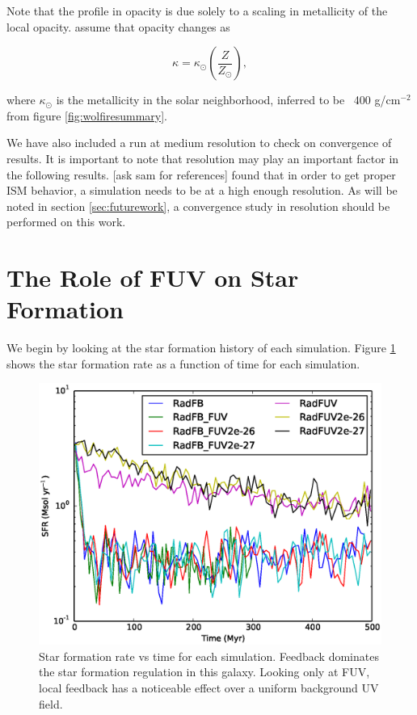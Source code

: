 Note that the profile in opacity is due solely to a scaling in metallicity of the local opacity. \citet{wolfireEt03} assume that opacity changes as

\begin{equation}
\kappa = \kappa_{\odot}\left(\frac{Z}{Z_{\odot}}\right),
\end{equation}

where $\kappa_{\odot}$ is the metallicity in the solar neighborhood, inferred to be ~400 g/cm$^{-2}$ from figure \ref{fig:wolfiresummary}.

We have also included a run at medium resolution to check on convergence of results. It is important to note that resolution may play an important factor in the following results. \citet{FILL IN} [ask sam for references] found that in order to get proper ISM behavior, a simulation needs to be at a high enough resolution. As will be noted in section \ref{sec:futurework}, a convergence study in resolution should be performed on this work.

\section{The Role of FUV on Star Formation}
\label{sec:fuvsfr}

We begin by looking at the star formation history of each simulation. Figure \ref{fig:sfrvtime} shows the star formation rate as a function of time for each simulation. 

\begin{figure}
\includegraphics[width=\textwidth]{graphics/sfrvtime.eps}
\caption[Star formation histories.]{Star formation rate vs time for each simulation. Feedback dominates the star formation regulation in this galaxy. Looking only at FUV, local feedback has a noticeable effect over a uniform background UV field.}
\label{fig:sfrvtime}
\end{figure}

